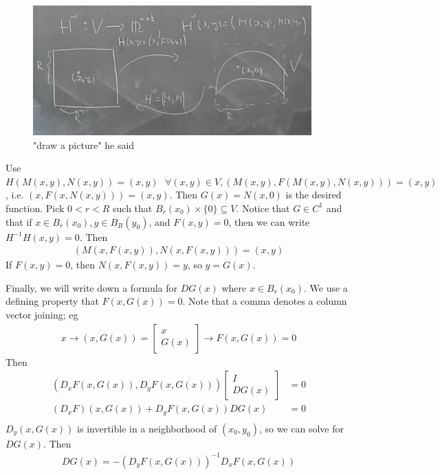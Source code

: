 \documentclass{article}
\newcommand*{\txt}[1]{\text{ #1 }}%
\newcommand*{\fora}{\txt{}\forall}%
\begin{document}
\begin{figure}[H]
    \centering
    \includegraphics[height=5cm]{fig5.png}
    \caption{"draw a picture" he said}
    \label{fig:fig5}
\end{figure}

Use $H(M(x,y),N(x,y))=(x,y)\fora (x,y)\in V, (M(x,y),F(M(x,y),N(x,y)))=(x,y)$, i.e. $(x,F(x,N(x,y)))=(x,y)$. Then $G(x)=N(x,0)$ is the desired function. Pick $0<r<R$ such that $B_r(x_0)\times \{0\}\subseteq V$. Notice that $G\in C^1$ and that if $x\in B_r(x_0), y\in B_R(y_0)$, and $F(x,y)=0$, then we can write $H^{-1}H(x,y)=0$. Then \begin{align*}
    (M(x,F(x,y)),N(x,F(x,y)))=(x,y)
\end{align*}If $F(x,y)=0$, then $N(x,F(x,y))=y$, so $y=G(x)$.

Finally, we will write down a formula for $DG(x)$ where $x\in B_r(x_0)$. We use a defining property that $F(x,G(x))=0$. Note that a comma denotes a column vector joining; eg \begin{align*}
    x\to (x,G(x))=\begin{bmatrix}
        x\\
        G(x)
    \end{bmatrix}\to F(x,G(x))=0
\end{align*}Then \begin{align*}
    (D_xF(x,G(x)),D_yF(x,G(x)))\begin{bmatrix}
        I\\
        DG(x)
    \end{bmatrix}&=0\\
    (D_xF)(x,G(x))+D_yF(x,G(x))DG(x)&=0\\
\end{align*}$D_y(x,G(x))$ is invertible in a neighborhood of $(x_0,y_0)$, so we can solve for $DG(x)$. Then \begin{align*}
    DG(x)=-(D_yF(x,G(x)))^{-1}D_xF(x,G(x))
\end{align*}
\end{document}
